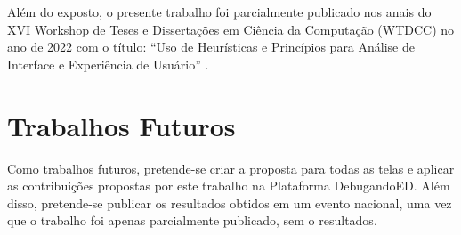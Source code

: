 Além do exposto, o presente trabalho foi parcialmente publicado nos anais do XVI Workshop de Teses e Dissertações em Ciência da Computação (WTDCC) no ano de 2022 com o título: “Uso de Heurísticas e Princípios para Análise de Interface e Experiência de Usuário” \cite{Zanetti2022}.

\section{Trabalhos Futuros}

Como trabalhos futuros, pretende-se criar a proposta para todas as telas e aplicar as contribuições propostas por este trabalho na Plataforma DebugandoED. Além disso, pretende-se publicar os resultados obtidos em um evento nacional, uma vez que o trabalho foi apenas parcialmente publicado, sem o resultados.
